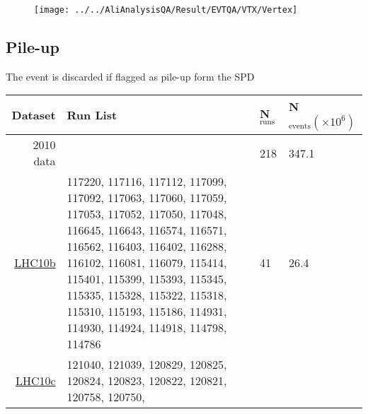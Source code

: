 \begin{figure}[!h]
\texttt{[image: ../../AliAnalysisQA/Result/EVTQA/VTX/Vertex]}
\label{fig:vertex}
\caption{}
\end{figure}

\subsection{Pile-up}
The event is discarded if flagged as pile-up form the SPD

\begin{table}[h]
\center
\begin{tabularx}{\textwidth}{r|Xll}
Dataset		&Run List 			&N$_{\text{runs}}$		&N$_{\text{events}} (\times10^{6})$\\
\hline
\hline
2010	 data		&				&218				&347.1								\\
\hline
\href{https://alimonitor.cern.ch/configuration/index.jsp?partition=LHC10b\&pass=4\&s=\&raw_run=\&filling_scheme=\&filling_config=\&fillno=\&energy=\&intensity_per_bunch=\&mu=\&interacting_bunches=\&noninteracting_bunches_beam_1=\&noninteracting_bunches_beam_2=\&interaction_trigger=\&rate=\&beam_empty_trigger=\&empty_empty_trigger=\&muon_trigger=\&high_multiplicity_trigger=\&emcal_trigger=\&calibration_trigger=\&quality=1\&muon_quality=\&physics_selection_status=\&comment=\&field=\&det_aco=\&det_ad0=\&det_emc=\&det_fmd=\&det_hlt=\&det_hmp=\&det_mch=\&det_mtr=\&det_phs=\&det_pmd=\&det_spd=\&det_sdd=\&det_ssd=\&det_tof=X\&det_tpc=X\&det_trd=\&det_t00=X\&det_v00=X\&det_zdc=\&hlt_mode=\&changedon=}{LHC10b}		&117220, 117116, 117112, 117099, 117092, 117063, 117060, 117059, 117053, 117052,
                                117050, 117048, 116645, 116643, 116574, 116571, 116562, 116403, 116402, 116288,
                                116102, 116081, 116079, 115414, 115401, 115399, 115393, 115345, 115335, 115328,
                                115322, 115318, 115310, 115193, 115186, 114931, 114930, 114924, 114918, 114798,
                                114786				&41				&26.4								\\
\href{https://alimonitor.cern.ch/configuration/index.jsp?partition=LHC10c\&pass=4\&s=\&raw_run=\&filling_scheme=\&filling_config=\&fillno=\&energy=\&intensity_per_bunch=\&mu=\&interacting_bunches=\&noninteracting_bunches_beam_1=\&noninteracting_bunches_beam_2=\&interaction_trigger=\&rate=\&beam_empty_trigger=\&empty_empty_trigger=\&muon_trigger=\&high_multiplicity_trigger=\&emcal_trigger=\&calibration_trigger=\&quality=1\&muon_quality=\&physics_selection_status=\&comment=\&field=\&det_aco=\&det_ad0=\&det_emc=\&det_fmd=\&det_hlt=\&det_hmp=\&det_mch=\&det_mtr=\&det_phs=\&det_pmd=\&det_spd=\&det_sdd=\&det_ssd=\&det_tof=X\&det_tpc=X\&det_trd=\&det_t00=X\&det_v00=X\&det_zdc=\&hlt_mode=\&changedon=}{LHC10c}		&121040, 121039, 120829, 120825, 120824, 120823, 120822, 120821, 120758, 120750,

\end{tabularx}
\end{table}

